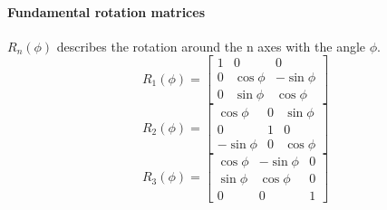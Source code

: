 \documentclass[12pt]{article}
\begin{document}
	\paragraph{Fundamental rotation matrices} $R_{n}(\phi)$ describes the rotation around the n axes with the angle $\phi$.\\
	\begin{equation}
	R_{1}(\phi) = 
	\begin{bmatrix}
	1 & 0 & 0\\
	0 & \cos \phi & -\sin \phi\\
	0 & \sin \phi & \cos \phi
	\end{bmatrix}
	\end{equation}
	\begin{equation}
	R_{2}(\phi) = 
	\begin{bmatrix}
	\cos \phi & 0 & \sin \phi\\
	0 & 1 & 0\\
	-\sin \phi & 0 & \cos \phi
	\end{bmatrix}
	\end{equation}
	\begin{equation}
	R_{3}(\phi) = 
	\begin{bmatrix}
	\cos \phi & -\sin \phi & 0\\
	\sin \phi & \cos \phi & 0\\
	0 & 0 & 1
	\end{bmatrix}
	\end{equation}
	
\end{document}

